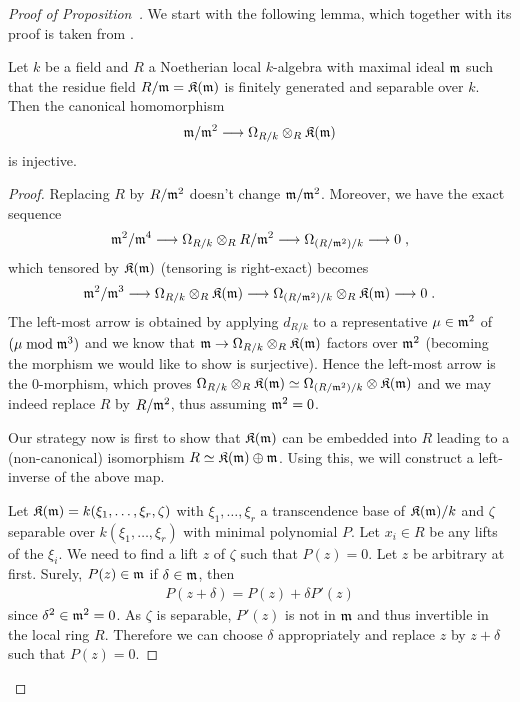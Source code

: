 \documentclass[a4paper,parskip=half,numbers=enddot, DIV=12, headheight=30pt]{scrreprt}
\begin{document}
\begin{proof}[Proof of Proposition~] We start with the following lemma, which together with its proof is taken from \cite[Tag~00TU]{stacks-project}.
\begin{lem}
	Let $k$ be a field and $R$ a Noetherian local $k$-algebra with maximal ideal $\mathfrak{m}$ such that the residue field $R/\mathfrak{m}=\mathfrak{K}(\mathfrak{m})$ is finitely generated and separable over $k$. Then the canonical homomorphism
	\begin{align*}
		\mm/\mm^2\morphism\Omega_{R/k}\otimes_R\KK(\mm)
	\end{align*}
	is injective.
\end{lem}
\begin{proof}
	Replacing $R$ by $R/\mathfrak{m}^2$ doesn't change $\mathfrak{m}/\mathfrak{m}^2$. Moreover, we have the exact sequence
	\begin{align*}
		\mm^2/\mm^4\morphism\Omega_{R/k}\otimes_R R/\mm^2\morphism\Omega_{(R/\mm^2)/k}\morphism 0\;,
	\end{align*}
	which tensored by $\mathfrak{K}(\mathfrak{m})$ (tensoring is right-exact) becomes
	\begin{align*}
		\mm^2/\mm^3\morphism\Omega_{R/k}\otimes_R \KK(\mm)\morphism\Omega_{(R/\mm^2)/k}\otimes_R\KK(\mm)\morphism 0\;.
	\end{align*}
	The left-most arrow is obtained by applying $d_{R/k}$ to a representative $\mu\in\mathfrak{m}^2$ of $(\mu\bmod\mathfrak{m}^3)$ and we know that $\mm\morphism\Omega_{R/k}\otimes_R\KK(\mm)$ factors over $\mathfrak{m}^2$ (becoming the morphism we would like to show is surjective). Hence the left-most arrow is the $0$-morphism, which proves $\Omega_{R/k}\otimes_R \mathfrak{K}(\mathfrak{m})\simeq\Omega_{(R/\mathfrak{m}^2)/k}\otimes\mathfrak{K}(\mathfrak{m})$ and we may indeed replace $R$ by $R/\mathfrak{m}^2$, thus assuming $\mathfrak{m}^2=0$.
	
	Our strategy now is first to show that $\mathfrak{K}(\mathfrak{m})$ can be embedded into $R$ leading to a (non-canonical) isomorphism $R\simeq\mathfrak{K}(\mathfrak{m})\oplus\mathfrak{m}$. Using this, we will construct a left-inverse of the above map.
	
	Let $\mathfrak{K}(\mathfrak{m})=k(\xi_1,\ldots,\xi_r,\zeta)$ with $\xi_1,\ldots,\xi_r$ a transcendence base of $\mathfrak{K}(\mathfrak{m})/k$ and $\zeta$ separable over $k(\xi_1,\ldots,\xi_r)$ with minimal polynomial $P$. Let $x_i\in R$ be any lifts of the $\xi_i$. We need to find a lift $z$ of $\zeta$ such that $P(z)=0$. Let $z$ be arbitrary at first. Surely, $P(z)\in\mathfrak{m}$ if $\delta\in\mathfrak{m}$, then
	\begin{align*}
		P(z+\delta)=P(z)+\delta P'(z)
	\end{align*}
	since $\delta^2\in\mathfrak{m}^2=0$. As $\zeta$ is separable, $P'(z)$ is not in $\mathfrak{m}$ and thus invertible in the local ring $R$. Therefore we can choose $\delta$ appropriately and replace $z$ by $z+\delta$ such that $P(z)=0$.
	

\end{proof}
\end{proof}
\end{document}
